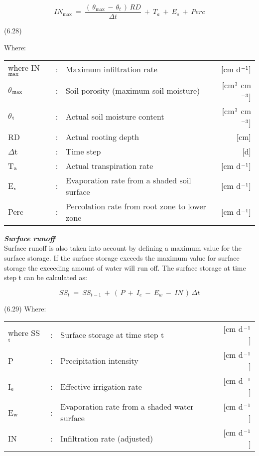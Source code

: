 \begin{equation}
IN_{\max } ~=~{\frac{(\, \theta  _{\max } \, -\, \theta  _{t} \, )\, RD}{\Delta t}} ~+~ T _{a} ~+~ E _{s} ~+~ Perc
\end{equation}

 
\strut\hfill (6.28)

Where:\\
\begin{tabularx}{\textwidth}{llXr}



where IN$_{{\rm max}}$ &:& Maximum infiltration rate  & [cm d$^{{\rm -1}}$]\\
$\theta$$_{{\rm max}}$ &:& Soil porosity (maximum soil moisture)  & [cm$^{{\rm 3}}$ cm$^{{\rm -3}}$]\\
$\theta$$_{{\rm t}}$ &:& Actual soil moisture content  & [cm$^{{\rm 3}}$ cm$^{{\rm -3}}$]\\
RD &:& Actual rooting depth  & [cm]\\
$\Delta$t &:& Time step  & [d]\\
T$_{{\rm a}}$ &:& Actual transpiration rate   & [cm d$^{{\rm -1}}$]\\
E$_{{\rm s}}$ &:& Evaporation rate from a shaded soil surface  & [cm d$^{{\rm -1}}$]\\
Perc &:& Percolation rate from root zone to lower zone  & [cm d$^{{\rm -1}}$]
\end{tabularx}
 {\bf {\it Surface runoff\/}}\\
Surface runoff is also taken into account by defining a maximum value for the surface
storage. If the surface storage exceeds the maximum value for surface storage the
exceeding amount of water will run off. The surface storage at time step t can be
calculated as:

\begin{equation}
SS_{t} ~=~ SS _{t-1} ~+~ (\, P ~+~ I _{e} ~-~ E _{w} ~-~ IN\, )\, \Delta t
\end{equation}

 
\strut\hfill (6.29)
Where:\\
\begin{tabularx}{\textwidth}{llXr}



where SS$_{{\rm t}}$ &:& Surface storage at time step t  & [cm d$^{{\rm -1}}$]\\
P &:& Precipitation intensity  & [cm d$^{{\rm -1}}$]\\
I$_{{\rm e}}$ &:& Effective irrigation rate  & [cm d$^{{\rm -1}}$]\\
E$_{{\rm w}}$ &:& Evaporation rate from a shaded water surface  & [cm d$^{{\rm -1}}$]\\
IN &:& Infiltration rate (adjusted)  & [cm d$^{{\rm -1}}$]
\end{tabularx}



